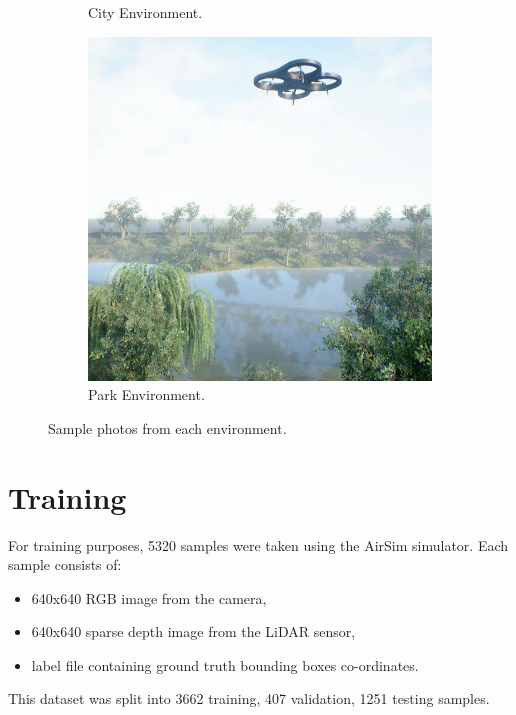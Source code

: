 \documentclass[twoside]{ctuthesis}
\theoremstyle{plain}
\theoremstyle{definition}
\theoremstyle{note}
\begin{document}
\begin{figure}
\begin{subfigure}[b]{0.3\textwidth}
		\caption{City Environment.}
	\end{subfigure}
	\hfill
	\begin{subfigure}[b]{0.3\textwidth}
		\centering
		\includegraphics[width=\textwidth]{park_rgb.png}
		\caption{Park Environment.}
	\end{subfigure}
	\caption{Sample photos from each environment.}
	\label{fig:ue_env}
\end{figure}
\section{Training}
For training purposes, 5320 samples were taken using the AirSim simulator. Each sample consists of:
\begin{itemize}
	\item 640x640 RGB image from the camera,
	\item 640x640 sparse depth image from the LiDAR sensor,
	\item label file containing ground truth bounding boxes co-ordinates.
\end{itemize}
This dataset was split into 3662 training, 407 validation, 1251 testing samples.
\end{document}
